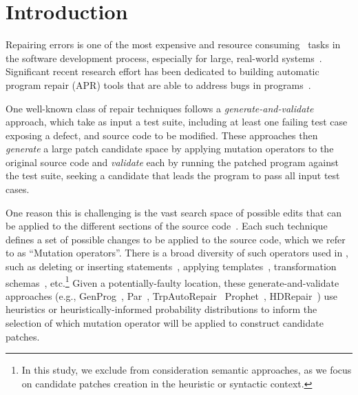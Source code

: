 \documentclass[conference]{IEEEtran}
\begin{document}
\section{Introduction} \label{introduction}
Repairing errors is one of the most expensive\cite{Tassey02,Britton13} and 
resource consuming~\cite{Weiss07} tasks in 
the software development process, especially for large, real-world systems~\cite{Liblit03,Anvik05}.
%
Significant recent research effort has been dedicated to
building automatic program repair (APR) tools that are able to address
bugs in 
programs~\cite{legoues12,kim2013,Weimer13,fan15,long15Proph,debroy10,perkins09,wei10}. 

One well-known class of repair techniques follows a 
\emph{generate-and-validate} approach, which take as input a test suite, 
including at
least one failing test case exposing
a defect, and source code to be 
modified.  These approaches then \emph{generate} a large patch candidate space 
by applying 
mutation operators to the original source code and \emph{validate} each by
running the patched  program against the test suite, seeking a candidate that
leads the program to pass all input test cases. 

One reason this is challenging is the vast search space of possible 
edits that can be applied to the different sections of the source 
code~\cite{long16}. Each such technique defines  a set of possible changes to be
applied to the source code, which we refer to as ``Mutation operators''. 
There is a broad diversity of such operators used in , such as deleting or inserting 
statements~\cite{legoues12}, applying templates~\cite{kim2013}, transformation 
schemas~\cite{fan15SPR}, etc.\footnote{In this study, we exclude 
from 
consideration semantic approaches, as we focus on
candidate patches creation in the heuristic or syntactic context.} 
Given a potentially-faulty location, these
generate-and-validate approaches (e.g., GenProg~\cite{legoues12}, 
Par~\cite{kim2013}, TrpAutoRepair~\cite{Qi13}
Prophet~\cite{long15Proph}, HDRepair~\cite{xuan16}) use heuristics or heuristically-informed probability distributions to inform the selection of 
which mutation operator
will be applied to construct candidate patches.
\end{document}
